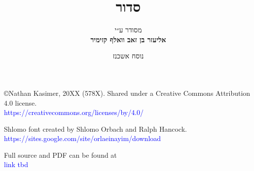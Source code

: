 \documentclass[twoside, openany, parskip=half, 11pt]{book}
\begin{document}
\title{  סדור \\

\vspace{.5in}
}

\author{מסודר ע״י
\\
\textbf{אליעזר בן זאב וואלף קזימיר}}
\date{נוסח אשכנז}

\maketitle

\begin{minipage}{\textwidth}
\begin{english}
\raggedright

©Nathan Kasimer, 20XX (578X). Shared under a Creative Commons Attribution 4.0 license.\\
\textcolor{blue}{https://creativecommons.org/licenses/by/4.0/}\\ \vspace{\baselineskip}


Shlomo font created by Shlomo Orbach and Ralph Hancock.\\ \textcolor{blue}{https://sites.google.com/site/orlaeinayim/download}\\ \vspace{\baselineskip}

Full \XeLaTeX \quad source and PDF can be found at\\ \textcolor{blue}{link tbd}\\ \vspace{\baselineskip}


\end{english}
\end{minipage}
\end{document}
